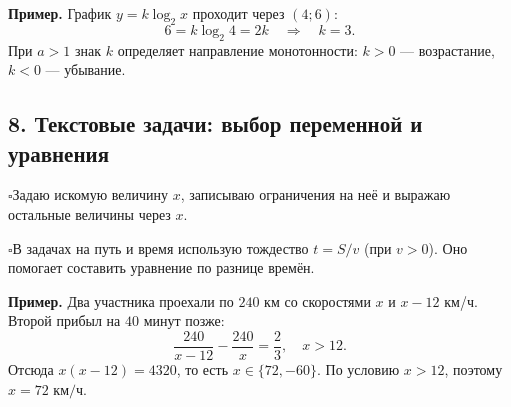 \documentclass[a4paper,12pt]{article}
\newcommand{\ck}{\(\square\)\enspace}
\newcommand{\topic}[1]{\needspace{5\baselineskip}\subsection*{\color{darkaccent}#1}}
\begin{document}
\begin{minipage}[c]{0.53\linewidth}
\textbf{Пример.} График $y=k\log_2 x$ проходит через $(4;6)$:
\[
6=k\log_2 4=2k\quad\Longrightarrow\quad\boxed{k=3}.
\]
При $a>1$ знак $k$ определяет направление монотонности: $k>0$ --- возрастание, $k<0$ --- убывание.
\end{minipage}\hfill
\begin{minipage}[c]{0.43\linewidth}
\end{minipage}

\topic{8. Текстовые задачи: выбор переменной и уравнения}
\ck Задаю искомую величину $x$, записываю ограничения на неё и выражаю остальные величины через $x$.

\ck В задачах на путь и время использую тождество $t=S/v$ (при $v>0$). Оно помогает составить уравнение по разнице времён.

\textbf{Пример.} Два участника проехали по $240$ км со скоростями $x$ и $x-12$ км/ч. Второй прибыл на $40$ минут позже:
\[
\frac{240}{x-12}-\frac{240}{x}=\frac23,\quad x>12.
\]
Отсюда $x(x-12)=4320$, то есть $x\in\{72,-60\}$. По условию $x>12$, поэтому $\boxed{x=72\text{ км/ч}}$.

\clearpage
\end{document}
